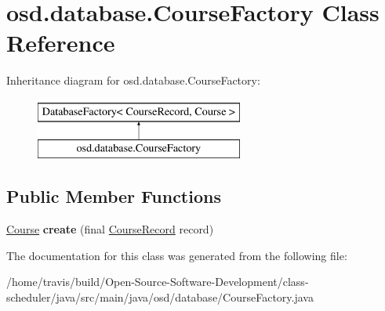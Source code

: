 \hypertarget{classosd_1_1database_1_1_course_factory}{\section{osd.\-database.\-Course\-Factory Class Reference}
\label{classosd_1_1database_1_1_course_factory}
}
Inheritance diagram for osd.\-database.\-Course\-Factory\-:\begin{figure}[H]
\begin{center}
\leavevmode
\includegraphics[height=2.000000cm]{classosd_1_1database_1_1_course_factory}
\end{center}
\end{figure}
\subsection*{Public Member Functions}
\begin{DoxyCompactItemize}
\item 
\hypertarget{classosd_1_1database_1_1_course_factory_aac6f17a0a0a2c5ede476c52c1f775a90}{\hyperlink{interfaceosd_1_1input_1_1_course}{Course} {\bfseries create} (final \hyperlink{classosd_1_1database_1_1_course_record}{Course\-Record} record)}\label{classosd_1_1database_1_1_course_factory_aac6f17a0a0a2c5ede476c52c1f775a90}

\end{DoxyCompactItemize}


The documentation for this class was generated from the following file\-:\begin{DoxyCompactItemize}
\item 
/home/travis/build/\-Open-\/\-Source-\/\-Software-\/\-Development/class-\/scheduler/java/src/main/java/osd/database/Course\-Factory.\-java\end{DoxyCompactItemize}
